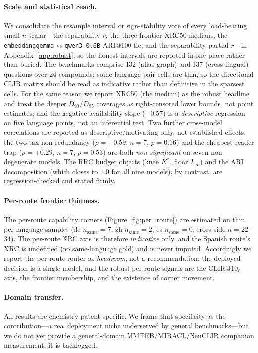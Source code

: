 \documentclass[11pt]{article}
\begin{document}
\paragraph{Scale and statistical reach.}
We consolidate the resample interval or sign-stability vote of every
load-bearing small-$n$ scalar---the separability $r$, the three frontier XRC50
medians, the \texttt{embeddinggemma}-vs-\texttt{qwen3-0.6B} ARI@100 tie, and the
separability partial-$r$---in Appendix~\ref{app:robust}, so the honest intervals
are reported in one place rather than buried.
The benchmarks comprise 132 (alias-graph) and 137 (cross-lingual) questions over
24 compounds; some language-pair cells are thin, so the directional CLIR matrix
should be read as indicative rather than definitive in the sparsest cells. For
the same reason we report XRC50 (the median) as the robust headline and treat
the deeper $D_{90}/D_{95}$ coverages as right-censored lower bounds, not point
estimates; and the negative availability slope ($-0.57$) is a \emph{descriptive}
regression on five language points, not an inferential test. Two further
cross-model correlations are reported as descriptive/motivating only, not
established effects: the two-tax non-redundancy
($\rho{=}{-}0.59$, $n{=}7$, $p{=}0.16$) and the cheapest-reader trap
($\rho{=}{+}0.29$, $n{=}7$, $p{=}0.53$) are both \emph{non-significant} on seven
non-degenerate models. The RRC budget objects (knee $K^{\!*}$, floor $L_\infty$)
and the ARI decomposition (which closes to $1.0$ for all nine models), by
contrast, are regression-checked and stated firmly.

\paragraph{Per-route frontier thinness.}
The per-route capability corners (Figure~\ref{fig:per_route}) are estimated on
thin per-language samples (de $n_{\text{same}}{=}7$, zh $n_{\text{same}}{=}2$, es
$n_{\text{same}}{=}0$; cross-side $n{=}22$--$34$). The per-route XRC axis is
therefore \emph{indicative} only, and the Spanish route's XRC is undefined (no
same-language gold) and is never imputed. Accordingly we report the per-route
router as \emph{headroom}, not a recommendation: the deployed decision is a single
model, and the robust per-route signals are the CLIR@10$_\ell$ axis, the frontier
membership, and the existence of corner movement.

\paragraph{Domain transfer.}
All results are chemistry-patent-specific. We frame that specificity as the
contribution---a real deployment niche underserved by general benchmarks---but
we do not yet provide a general-domain MMTEB/MIRACL/NeuCLIR companion
measurement; it is backlogged.
\end{document}
